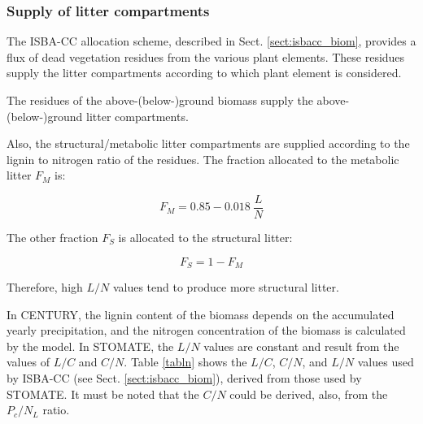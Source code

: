 {%
\subsubsection{Supply of litter compartments}

The ISBA-CC allocation scheme, described in Sect. \ref{sect:isbacc_biom}, 
provides a flux of dead vegetation residues from the various plant elements. 
These residues supply the litter compartments according to which plant 
element is considered. 

The residues of the above-(below-)ground biomass supply the above-(below-)ground litter compartments. 

Also, the structural/metabolic litter compartments are supplied according to the lignin to nitrogen ratio 
of the residues. 
The fraction allocated to the metabolic litter $F_M$ is:

\begin{equation}
F_M = 0.85 - 0.018 \: \frac{L}{N}
\end{equation}

The other fraction $F_S$ is allocated to the structural litter:

\begin{equation}
F_S = 1 - F_M
\end{equation}

Therefore, high $L/N$ values tend to produce more structural litter. 

In CENTURY, the lignin content of the biomass depends on 
the accumulated yearly precipitation, and the nitrogen concentration of the biomass 
is calculated by the model. 
In STOMATE, the $L/N$ values are constant and result from the values of 
$L/C$ and $C/N$.
Table \ref{tabln} shows the $L/C$, $C/N$, and $L/N$ values used by ISBA-CC 
(see Sect. \ref{sect:isbacc_biom}), derived from those used by STOMATE.
It must be noted that the $C/N$ could be derived, also, from the $P_c/N_L$ ratio.


}
